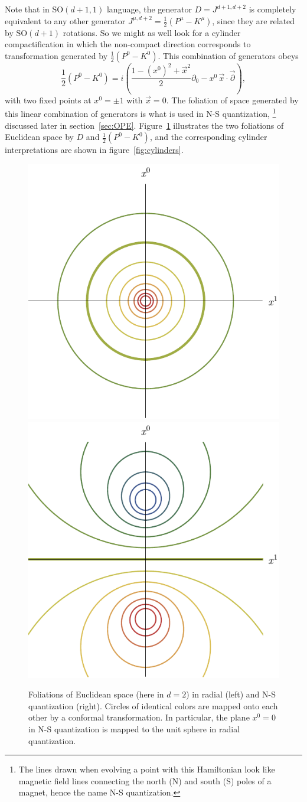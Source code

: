 \documentclass[a4paper,12pt]{article}
\newcommand{\SO}{\text{SO}}
\numberwithin{equation}{section}
\begin{document}
Note that in $\SO(d + 1, 1)$ language, the generator $D = J^{d+1, d+2}$ is completely equivalent to any other generator $J^{\mu, d+2} = \frac{1}{2} \left( P^\mu - K^\mu \right)$, since they are related by  $\SO(d + 1)$ rotations. So we might as well look for a cylinder compactification in which the non-compact direction corresponds to transformation generated by
$\frac{1}{2} \left( P^0 - K^0 \right)$. This combination of generators obeys
\begin{equation}
	\frac{1}{2} \left( P^0 - K^0 \right)
	= i \left( \frac{1 - (x^0)^2 + \vec{x}^2}{2} \partial_0
	- x^0 \, \vec{x} \cdot \vec{\partial} \right),
\end{equation}
with two fixed points at $x^0 = \pm 1$ with $\vec{x} = 0$. 
The foliation of space generated by this linear combination of generators is what is used in N-S quantization,%
%
\footnote{The lines drawn when evolving a point with this Hamiltonian look like magnetic field lines connecting the north (N) and south (S) poles of a magnet, hence the name N-S quantization.}
discussed later in section~\ref{sec:OPE}.
Figure~\ref{fig:foliations} illustrates the two foliations of Euclidean space by $D$ and $\frac{1}{2} \left( P^0 - K^0 \right)$,
and the corresponding cylinder interpretations are shown in figure~\ref{fig:cylinders}.
%
\begin{figure}
	\includegraphics[width=0.48\linewidth]{figures/Rfoliation.pdf}
	\hfill
	\includegraphics[width=0.48\linewidth]{figures/NSfoliation.pdf}
	\caption{Foliations of Euclidean space
	(here in $d = 2$) 
	in radial (left) and N-S quantization (right).
	Circles of identical colors are mapped onto each other
	by a conformal transformation. In particular, the plane 
	$x^0 = 0$ in N-S quantization is mapped to the unit sphere 
	in radial quantization.}
	\label{fig:foliations}
\end{figure}
\end{document}

